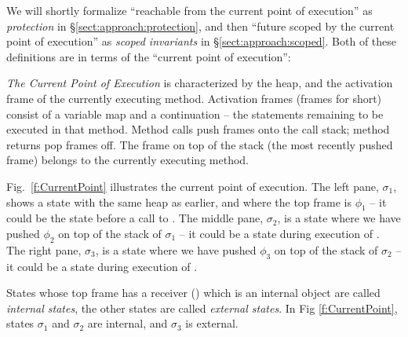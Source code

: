 \vspace{.2cm}
 
\noindent 

\noindent We will shortly formalize ``reachable from the current point of execution'' as
\emph{protection} in \S \ref{sect:approach:protection},
and then  ``future scoped by the current point of execution''
as  \emph{scoped invariants} in \S \ref{sect:approach:scoped}.
Both of these definitions are in terms of the ``current point of execution'':

\noindent\emph{The Current Point of Execution}
is characterized by the heap, and   the activation frame of the currently executing method. 
Activation frames (frames for short) consist of a variable map and a continuation -- the statements remaining to be executed in that method.
Method calls push frames onto the call stack; method returns pop frames off.
The frame on top of the stack (the most recently pushed frame) 
belongs to the currently executing method.


Fig.\ \ref{f:CurrentPoint} illustrates the current point of execution.  The left pane, $\sigma_1$, shows a state with the same heap as earlier, and where the top frame is $\phi_1$ -- it could be the state before a call to .
  The middle pane, $\sigma_2$, is a state where we have pushed  $\phi_2$ on top of the stack of $\sigma_1$ -- it could be a state during execution of .
   The right pane, $\sigma_3$, is a state where we have pushed  $\phi_3$ on top of the stack of $\sigma_2$ -- it could be a state during execution of . 

States whose top frame has a  receiver () which is an internal object are called  \emph{internal states}, the other states are called  \emph{external states}. In Fig \ref{f:CurrentPoint}, states $\sigma_1$ and $\sigma_2$ are internal, and  $\sigma_3$ is external.




